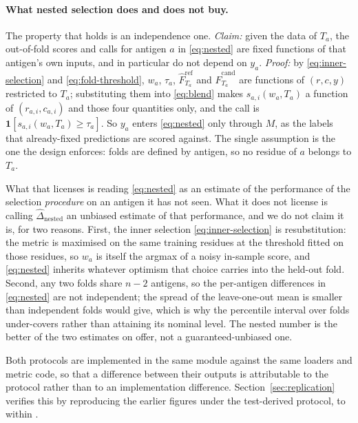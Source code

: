 \paragraph{What nested selection does and does not buy.} The property that
holds is an independence one. \emph{Claim:} given the data of \(T_a\), the
out-of-fold scores and calls for antigen \(a\) in \eqref{eq:nested} are fixed
functions of that antigen's own inputs, and in particular do not depend on
\(y_a\). \emph{Proof:} by \eqref{eq:inner-selection} and
\eqref{eq:fold-threshold}, \(w_a\), \(\tau_a\),
\(\hat{F}^{\mathrm{ref}}_{T_a}\) and \(\hat{F}^{\mathrm{cand}}_{T_a}\) are
functions of \((r,c,y)\) restricted to \(T_a\); substituting them into
\eqref{eq:blend} makes \(s_{a,i}(w_a,T_a)\) a function of \((r_{a,i},c_{a,i})\)
and those four quantities only, and the call is
\(\mathbf{1}[s_{a,i}(w_a,T_a)\ge\tau_a]\). So \(y_a\) enters \eqref{eq:nested}
only through \(M\), as the labels that already-fixed predictions are scored
against. The single assumption is the one the design enforces: folds are
defined by antigen, so no residue of \(a\) belongs to \(T_a\).

What that licenses is reading \eqref{eq:nested} as an estimate of the
performance of the selection \emph{procedure} on an antigen it has not seen.
What it does not license is calling \(\widehat{\Delta}_{\mathrm{nested}}\) an
unbiased estimate of that performance, and we do not claim it is, for two
reasons. First, the inner selection \eqref{eq:inner-selection} is
resubstitution: the metric is maximised on the same training residues at the
threshold fitted on those residues, so \(w_a\) is itself the argmax of a noisy
in-sample score, and \eqref{eq:nested} inherits whatever optimism that choice
carries into the held-out fold. Second, any two folds share \(n-2\) antigens,
so the per-antigen differences in \eqref{eq:nested} are not independent; the
spread of the leave-one-out mean is smaller than independent folds would give,
which is why the percentile interval over folds under-covers rather than
attaining its nominal level. The nested number is the better of the two
estimates on offer, not a guaranteed-unbiased one.

Both protocols are implemented in the same module against the same loaders and
metric code, so that a difference between their outputs is attributable to the
protocol rather than to an implementation difference. Section~\ref{sec:replication}
verifies this by reproducing the earlier figures under the test-derived
protocol, to within \TunedBpThreeReplicationMaxDiff{}.
